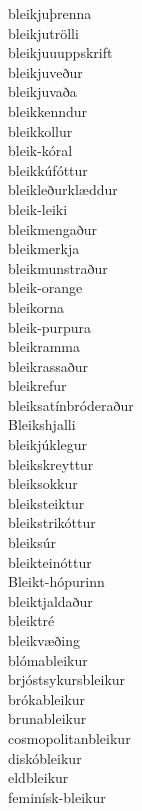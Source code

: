 \documentclass[../samsetningasafn.tex]{subfiles}
\begin{document}
\begin{bigwordlist}
\begin{center}
\begin{footnotesize}
\begin{multicols}{4}
\begin{description}
		\item [bleikjuþrenna]
		\item [bleikjutrölli]
		\item [bleikjuuuppskrift]
		\item [bleikjuveður]
		\item [bleikjuvaða]
		\item [bleikkenndur]
		\item [bleikkollur]
		\item [bleik-kóral]
		\item [bleikkúfóttur]
		\item [bleikleðurklæddur]
		\item [bleik-leiki]
		\item [bleikmengaður]
		\item [bleikmerkja]
		\item [bleikmunstraður]
		\item [bleik-orange]
		\item [bleikorna]
		\item [bleik-purpura]
		\item [bleikramma]
		\item [bleikrassaður]
		\item [bleikrefur]
		\item [bleiksatínbróderaður]
		\item [Bleikshjalli]
		\item [bleikjúklegur]
		\item [bleikskreyttur]
		\item [bleiksokkur]
		\item [bleiksteiktur]
		\item [bleikstrikóttur]
		\item [bleiksúr]
		\item [bleikteinóttur]
		\item [Bleikt-hópurinn]
		\item [bleiktjaldaður]
		\item [bleiktré]
		\item [bleikvæðing]
		\item [blómableikur]
		\item [brjóstsykursbleikur]
		\item [brókableikur]
		\item [brunableikur]
		\item [cosmopolitanbleikur]
		\item [diskóbleikur]
		\item [eldbleikur]
		\item [feminísk-bleikur]

\end{description}
\end{multicols}
\end{footnotesize}
\end{center}
\end{bigwordlist}
\end{document}
